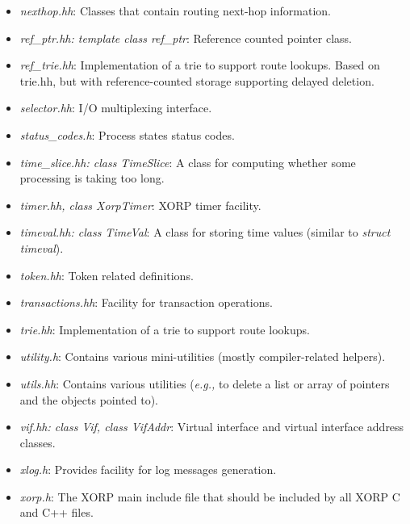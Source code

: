 \documentclass[11pt]{article}
\newcommand{\eg}{\emph{e.g.,}\xspace}
\begin{document}
\begin{itemize}
  \item \emph{nexthop.hh}: Classes that contain routing next-hop
  information.

  \item \emph{ref\_ptr.hh: template class ref\_ptr}: Reference counted
  pointer class.

  \item \emph{ref\_trie.hh}: Implementation of a trie to support route
  lookups.  Based on trie.hh, but with reference-counted storage
  supporting delayed deletion.

  \item \emph{selector.hh}: I/O multiplexing interface.

  \item \emph{status\_codes.h}: Process states status codes.

  \item \emph{time\_slice.hh: class TimeSlice}: A class for computing
  whether some processing is taking too long.

  \item \emph{timer.hh, class XorpTimer}: XORP timer facility.

  \item \emph{timeval.hh: class TimeVal}: A class for storing time values
  (similar to \emph{struct timeval}).

  \item \emph{token.hh}: Token related definitions.

  \item \emph{transactions.hh}: Facility for transaction operations.

  \item \emph{trie.hh}: Implementation of a trie to support route
  lookups.

  \item \emph{utility.h}: Contains various mini-utilities
  (mostly compiler-related helpers).

  \item \emph{utils.hh}: Contains various utilities (\eg to delete a
  list or array of pointers and the objects pointed to).

  \item \emph{vif.hh: class Vif, class VifAddr}: Virtual interface and
  virtual interface address classes.

  \item \emph{xlog.h}: Provides facility for log messages generation.

  \item \emph{xorp.h}: The XORP main include file that should be included
  by all XORP C and C++ files.

\end{itemize}
\end{document}
